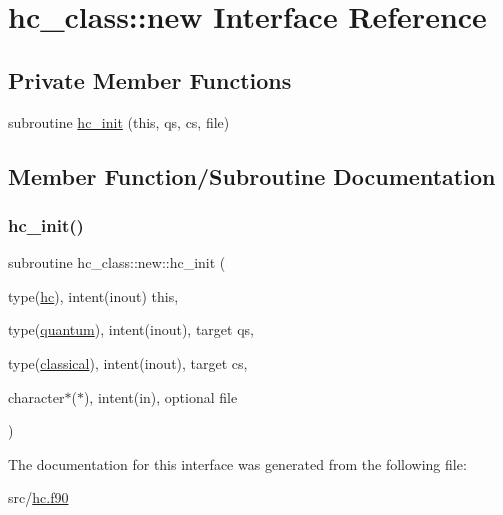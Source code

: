 \hypertarget{interfacehc__class_1_1new}{}\section{hc\+\_\+class\+:\+:new Interface Reference}
\label{interfacehc__class_1_1new}
\subsection*{Private Member Functions}
\begin{DoxyCompactItemize}
\item 
subroutine \hyperlink{interfacehc__class_1_1new_a443c6206b6aa3dc9ad6dfb544f41f717}{hc\+\_\+init} (this, qs, cs, file)
\end{DoxyCompactItemize}


\subsection{Member Function/\+Subroutine Documentation}
\mbox{\label{interfacehc__class_1_1new_a443c6206b6aa3dc9ad6dfb544f41f717}} 
\subsubsection{\texorpdfstring{hc\+\_\+init()}{hc\_init()}}
{\footnotesize\ttfamily subroutine hc\+\_\+class\+::new\+::hc\+\_\+init (\begin{DoxyParamCaption}\item[{type(\hyperlink{structhc__class_1_1hc}{hc}), intent(inout)}]{this,  }\item[{type(\hyperlink{structquantum__class_1_1quantum}{quantum}), intent(inout), target}]{qs,  }\item[{type(\hyperlink{structclassical__class_1_1classical}{classical}), intent(inout), target}]{cs,  }\item[{character$\ast$($\ast$), intent(in), optional}]{file }\end{DoxyParamCaption})\hspace{0.3cm}{\ttfamily [private]}}



The documentation for this interface was generated from the following file\+:\begin{DoxyCompactItemize}
\item 
src/\hyperlink{hc_8f90}{hc.\+f90}\end{DoxyCompactItemize}
